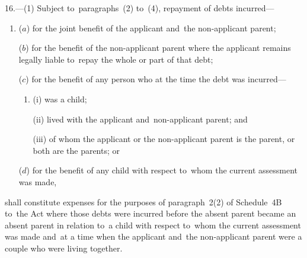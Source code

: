 \documentclass[12pt,a4paper]{article}
\begin{document}
16.—(1) Subject
to~paragraphs~(2) to~(4), repayment of debts incurred—
\begin{enumerate}\item[]
($a$) for the joint benefit of the applicant and~the non-applicant parent;

($b$) for the benefit of the non-applicant parent where the applicant remains
legally liable to~repay the whole or part of that debt;

($c$) for the benefit of any person who at the time the debt was incurred—
\begin{enumerate}\item[]
(i) was a child;

(ii) lived with the applicant and~non-applicant parent; and

(iii) of whom the applicant or the non-applicant parent is the parent, or both
are the parents; or
\end{enumerate}

($d$) for the benefit of any child with respect to~whom the current assessment was
made,
\end{enumerate}
shall constitute expenses for the purposes of paragraph~2(2) of Schedule~4B to~the Act where those debts were incurred before the absent parent became an absent parent in relation to~a child with respect to~whom the current assessment was made and~at a time when the applicant and~the non-applicant parent were 
a couple  %
who were living together.
\end{document}
